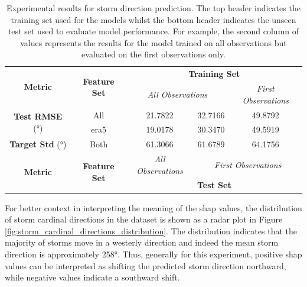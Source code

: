\begin{table}[ht]
\centering
\caption{Experimental results for storm direction prediction. The top header indicates the training set used for the models whilst the bottom header indicates the unseen test set used to evaluate model performance. For example, the second column of values represents the results for the model trained on all observations but evaluated on the first observations only.}
\label{tab:storm_direction_results}
\begin{tabular}{|c|c|c|c|c|}
\hline
\multirow{2}{*}{\textbf{Metric}} & \multirow{2}{*}{\textbf{Feature Set}} & \multicolumn{3}{c|}{\textbf{Training Set} } \\ \cline{3-5}
 & & \multicolumn{2}{c|}{\textit{All Observations}} & \textit{First Observations} \\
\hline \hline
\multirow{2}{*}{\textbf{Test RMSE} (\unit{\degree})} & All & 21.7822 & 32.7166 & 49.8792 \\
 & \acrshort{era5} & 19.0178 & 30.3470 & 49.5919 \\
\hline
\textbf{Target Std} (\unit{\degree}) & Both & 61.3066 & 61.6789 & 64.1756 \\
\hline \hline
\multirow{2}{*}{\textbf{Metric}} & \multirow{2}{*}{\textbf{Feature Set}} & \textit{All Observations} & \multicolumn{2}{c|}{\textit{First Observations}} \\ \cline{3-5}
 & & \multicolumn{3}{c|}{\textbf{Test Set}} \\ 
\hline
\end{tabular}
\end{table}

For better context in interpreting the meaning of the \acrshort{shap} values, the distribution of storm cardinal directions in the dataset is shown as a radar plot in Figure \ref{fig:storm_cardinal_directions_distribution}. The distribution indicates that the majority of storms move in a westerly direction and indeed the mean storm direction is approximately \ang{258}. Thus, generally for this experiment, positive \acrshort{shap} values can be interpreted as shifting the predicted storm direction northward, while negative values indicate a southward shift.

